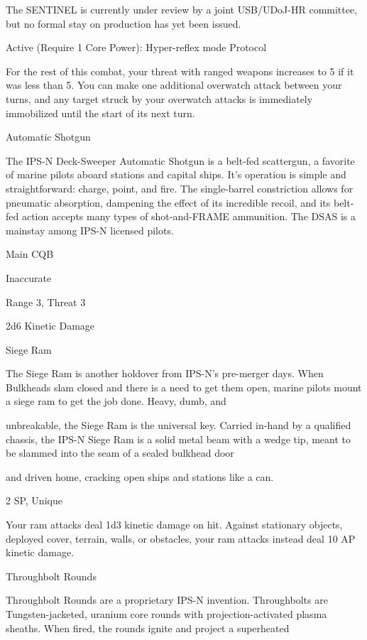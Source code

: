    The SENTINEL is currently under review by a joint USB/UDoJ-HR committee, but no formal stay on  
  production has yet been issued.    

  Active (Require 1 Core Power): Hyper-reflex mode  
   Protocol
 
   For the rest of this combat, your threat with ranged weapons increases to 5 if it was less than 5. You  
  can make one additional overwatch attack between your turns, and any target struck by your  
  overwatch attacks is immediately immobilized until the start of its next turn. 

Automatic Shotgun  

The IPS-N Deck-Sweeper Automatic Shotgun is a belt-fed scattergun, a favorite of marine pilots aboard stations and  
capital ships. It’s operation is simple and straightforward: charge, point, and fire. The single-barrel constriction allows  
for pneumatic absorption, dampening the effect of its incredible recoil, and its belt-fed action accepts many types of  
shot-and-FRAME ammunition.   
The DSAS is a mainstay among IPS-N licensed pilots.     

Main CQB
 
Inaccurate
 
Range 3, Threat 3
 
2d6 Kinetic Damage
 

Siege Ram  

The Siege Ram is another holdover from IPS-N’s pre-merger days. When Bulkheads slam closed and there  
is a need to get them open, marine pilots mount a siege ram to get the job done. Heavy, dumb, and  

unbreakable, the Siege Ram is the universal key. Carried in-hand by a qualified chassis, the IPS-N Siege  
Ram is a solid metal beam with a wedge tip, meant to be slammed into the seam of a sealed bulkhead door  

and driven home, cracking open ships and stations like a can.    

2 SP, Unique
 

                                                                                                                          


Your ram attacks deal 1d3 kinetic damage on hit. Against stationary objects, deployed cover,  
terrain, walls, or obstacles, your ram attacks instead deal 10 AP kinetic damage.
 

Throughbolt Rounds  

Throughbolt Rounds are a proprietary IPS-N invention. Throughbolts are Tungsten-jacketed, uranium core  
rounds with projection-activated plasma sheaths. When fired, the rounds ignite and project a superheated  

